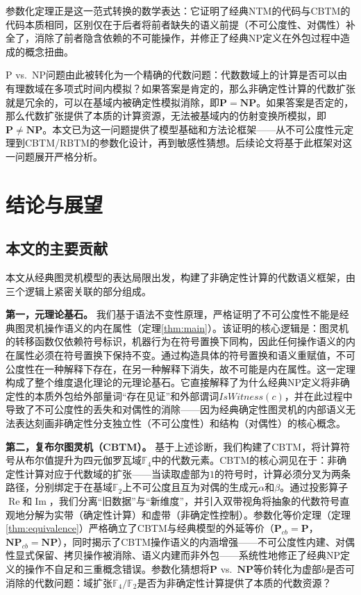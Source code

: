 \documentclass{ctexart}
\begin{document}
	参数化定理正是这一范式转换的数学表达：它证明了经典NTM的代码与CBTM的代码本质相同，区别仅在于后者将前者缺失的语义前提（不可公度性、对偶性）补全了，消除了前者隐含依赖的不可能操作，并修正了经典NP定义在外包过程中造成的概念扭曲。
	
	P vs.\ NP问题由此被转化为一个精确的代数问题：代数数域上的计算是否可以由有理数域在多项式时间内模拟？如果答案是肯定的，那么非确定性计算的代数扩张就是冗余的，可以在基域内被确定性模拟消除，即$\mathbf{P} = \mathbf{NP}$。如果答案是否定的，那么代数扩张提供了本质的计算资源，无法被基域内的仿射变换所模拟，即$\mathbf{P} \neq \mathbf{NP}$。本文已为这一问题提供了模型基础和方法论框架——从不可公度性元定理到CBTM/RBTM的参数化设计，再到敏感性猜想。后续论文将基于此框架对这一问题展开严格分析。
	
	
	\section{结论与展望}
	
	\subsection{本文的主要贡献}
	
	本文从经典图灵机模型的表达局限出发，构建了非确定性计算的代数语义框架，由三个逻辑上紧密关联的部分组成。
	
	\textbf{第一，元理论基石。} 我们基于语法不变性原理，严格证明了不可公度性不能是经典图灵机操作语义的内在属性（定理\ref{thm:main}）。该证明的核心逻辑是：图灵机的转移函数仅依赖符号标识，机器行为在符号置换下同构，因此任何操作语义的内在属性必须在符号置换下保持不变。通过构造具体的符号置换和语义重赋值，不可公度性在一种解释下存在，在另一种解释下消失，故不可能是内在属性。这一定理构成了整个维度退化理论的元理论基石。它直接解释了为什么经典NP定义将非确定性的本质外包给外部量词``存在见证''和外部谓词$IsWitness(c)$，并在此过程中导致了不可公度性的丢失和对偶性的消除——因为经典确定性图灵机的内部语义无法表达刻画非确定性分支独立性（不可公度性）和结构（对偶性）的核心概念。
	
	\textbf{第二，复布尔图灵机（CBTM）。} 基于上述诊断，我们构建了CBTM，将计算符号从布尔值提升为四元伽罗瓦域$\mathbb{F}_4$中的代数元素。CBTM的核心洞见在于：非确定性计算对应于代数域的扩张——当读取虚部为$1$的符号时，计算必须分叉为两条路径，分别绑定于在基域$\mathbb{F}_2$上不可公度且互为对偶的生成元$\alpha$和$\beta$。通过投影算子$\operatorname{Re}$和$\operatorname{Im}$，我们分离``旧数据''与``新维度''，并引入双带视角将抽象的代数符号直观地分解为实带（确定性计算）和虚带（非确定性控制）。参数化等价定理（定理\ref{thm:equivalence}）严格确立了CBTM与经典模型的外延等价（$\mathbf{P}_{cb}=\mathbf{P}$，$\mathbf{NP}_{cb}=\mathbf{NP}$），同时揭示了CBTM操作语义的内涵增强——不可公度性内建、对偶性显式保留、拷贝操作被消除、语义内建而非外包——系统性地修正了经典NP定义的操作不自足和三重概念错误。参数化猜想将$\mathbf{P}$ vs.\ $\mathbf{NP}$等价转化为虚部$b$是否可消除的代数问题：域扩张$\mathbb{F}_4/\mathbb{F}_2$是否为非确定性计算提供了本质的代数资源？
	
\end{document}

